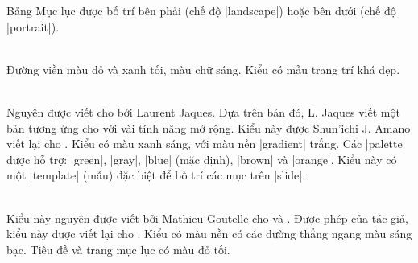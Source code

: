 \begin{description}
Bảng Mục lục được bố trí bên phải (chế độ |landscape|) hoặc bên dưới
(chế độ |portrait|).
\\
\item{}\\
Đường viền màu đỏ và xanh tối, màu chữ sáng.
Kiểu có mẫu trang trí khá đẹp.
\\
\item{}\\
Nguyên được viết cho  bởi Laurent Jaques.
Dựa trên bản đó, L. Jaques viết một bản tương ứng cho 
với vài tính năng mở rộng. Kiểu này được Shun'ichi J. Amano 
viết lại cho . Kiểu có màu xanh sáng, với màu nền
|gradient| trắng. Các |palette| được hỗ trợ: |green|, |gray|,
|blue| (mặc định), |brown| và |orange|. Kiểu này có một |template|
(mẫu) đặc biệt để bố trí các mục trên |slide|.
\\
\item{}\\
Kiểu này nguyên được viết bởi Mathieu Goutelle cho  và .
Được phép của tác giả, kiểu này được viết lại cho .
Kiểu có màu nền có các đường thẳng ngang màu sáng bạc.
Tiêu đề và trang mục lục có màu đỏ tối.
\\
\item{}\\

\end{description}
